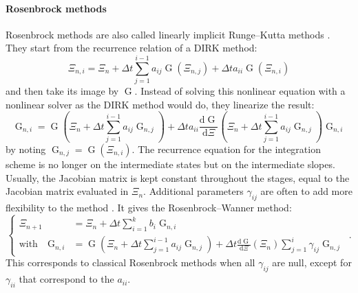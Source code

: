         \paragraph{Rosenbrock methods}
        Rosenbrock methods are also called linearly implicit Runge--Kutta methods \cite{Rosenbrock1963}.
        They start from the recurrence relation of a DIRK method:
        \begin{equation}
          \Xi_{n,i} = \Xi_n + \Delta t \sum_{j = 1}^{i-1} a_{ij} \operatorname{G}\left(\Xi_{n,j}\right) + \Delta t a_{ii} \operatorname{G}\left(\Xi_{n,i}\right)
        \end{equation}
        and then take its image by $\operatorname{G}$.
        Instead of solving this nonlinear equation with a nonlinear solver as the DIRK method would do, they linearize the result:
        \begin{equation}
          \operatorname{G}_{n,i} = \operatorname{G}\left(\Xi_n + \Delta t \sum_{j = 1}^{i-1} a_{ij} \operatorname{G}_{n,j}\right)
          + \Delta t a_{ii} \frac{\mathrm{d} \operatorname{G}}{\mathrm{d} \Xi}\left(\Xi_n + \Delta t \sum_{j = 1}^{i-1} a_{ij} \operatorname{G}_{n,j}\right) \operatorname{G}_{n,i}
        \end{equation}
        by noting $\operatorname{G}_{n,j} = \operatorname{G}\left(\Xi_{n,i}\right)$.
        The recurrence equation for the integration scheme is no longer on the intermediate states but on the intermediate slopes.
        Usually, the Jacobian matrix is kept constant throughout the stages, equal to the Jacobian matrix evaluated in $\Xi_n$.
        Additional parameters $\gamma_{ij}$ are often to add more flexibility to the method \cite{Wanner1977}.
        It gives the Rosenbrock--Wanner method:
        \begin{equation}
          \left\{\begin{aligned}
            \Xi_{n+1} &= \Xi_n + \Delta t \sum_{i = 1}^k b_i \operatorname{G}_{n,i} \\
            \textrm{with}\quad \operatorname{G}_{n,i} &=
              \operatorname{G}\left(\Xi_n + \Delta t \sum_{j = 1}^{i-1} a_{ij} \operatorname{G}_{n,j}\right)
              + \Delta t \frac{\mathrm{d} \operatorname{G}}{\mathrm{d} \Xi}\left(\Xi_n\right) \sum_{j = 1}^{i} \gamma_{ij} \operatorname{G}_{n,j}
          \end{aligned}\right. \ .
        \end{equation}
        This corresponds to classical Rosenbrock methods when all $\gamma_{ij}$ are null, except for $\gamma_{ii}$ that correspond to the $a_{ii}$.
